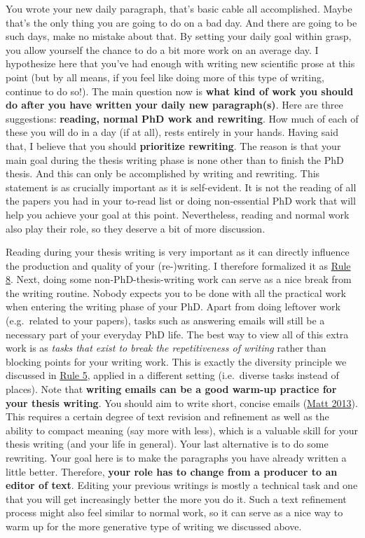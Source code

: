 \documentclass[
  12pt,
]{book}
\begin{document}
You wrote your new daily paragraph, that's basic cable all accomplished.
Maybe that's the only thing you are going to do on a bad day.
And there are going to be such days, make no mistake about that.
By setting your daily goal within grasp, you allow yourself the chance to do a bit more work on an average day.
I hypothesize here that you've had enough with writing new scientific prose at this point (but by all means, if you feel like doing more of this type of writing, continue to do so!).
The main question now is \textbf{what kind of work you should do after you have written your daily new paragraph(s)}.
Here are three suggestions: \textbf{reading, normal PhD work and rewriting}.
How much of each of these you will do in a day (if at all), rests entirely in your hands.
Having said that, I believe that you should \textbf{prioritize rewriting}.
The reason is that your main goal during the thesis writing phase is none other than to finish the PhD thesis.
And this can only be accomplished by writing and rewriting.
This statement is as crucially important as it is self-evident.
It is not the reading of all the papers you had in your to-read list or doing non-essential PhD work that will help you achieve your goal at this point.
Nevertheless, reading and normal work also play their role, so they deserve a bit of more discussion.

Reading during your thesis writing is very important as it can directly influence the production and quality of your (re-)writing.
I therefore formalized it as \protect\hyperlink{rule8}{Rule 8}.
Next, doing some non-PhD-thesis-writing work can serve as a nice break from the writing routine.
Nobody expects you to be done with all the practical work when entering the writing phase of your PhD.
Apart from doing leftover work (e.g.~related to your papers), tasks such as answering emails will still be a necessary part of your everyday PhD life.
The best way to view all of this extra work is as \emph{tasks that exist to break the repetitiveness of writing} rather than blocking points for your writing work.
This is exactly the diversity principle we discussed in \protect\hyperlink{rule5}{Rule 5}, applied in a different setting (i.e.~diverse tasks instead of places).
Note that \textbf{writing emails can be a good warm-up practice for your thesis writing}.
You should aim to write short, concise emails (\protect\hyperlink{ref-email-MattMight}{Matt 2013}).
This requires a certain degree of text revision and refinement as well as the ability to compact meaning (say more with less), which is a valuable skill for your thesis writing (and your life in general).
Your last alternative is to do some rewriting.
Your goal here is to make the paragraphs you have already written a little better.
Therefore, \textbf{your role has to change from a producer to an editor of text}.
Editing your previous writings is mostly a technical task and one that you will get increasingly better the more you do it.
Such a text refinement process might also feel similar to normal work, so it can serve as a nice way to warm up for the more generative type of writing we discussed above.
\end{document}
